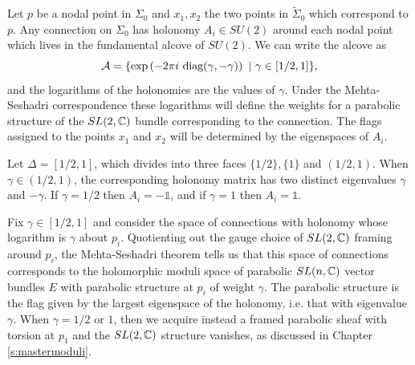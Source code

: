 	Let $p$ be a nodal point in $\Sigma_0$ and $x_1,x_2$ the two points in $\tilde{\Sigma}_0$ which correspond to $p$. Any connection on $\Sigma_0$ has holonomy $A_i\in SU(2)$ around each nodal point which lives in the fundamental alcove of $SU(2)$. We can write the alcove as
	\begin{equation}
		\mathcal{A} = \{\exp\left(
		-2\pi i ~\text{diag}(\gamma, -\gamma)
		\right)~|~ \gamma \in[1/2,1]\},
	\end{equation}
	and the logarithms of the holonomies are the values of $\gamma$. Under the Mehta-Seshadri correspondence these logarithms will define the weights for a parabolic structure of the $SL(2,\mathbb{C})$ bundle corresponding to the connection. The flags assigned to the points $x_1$ and $x_2$ will be determined by the eigenspaces of $A_i$.
	
	Let $\Delta = [1/2,1]$, which divides into three faces $\{1/2\}, \{1\}$ and $(1/2,1)$. When $\gamma \in (1/2,1)$, the corresponding holonomy matrix has two distinct eigenvalues $\gamma$ and $-\gamma$.  If $\gamma=1/2$ then $A_i = -\mathds{1}$, and if $\gamma = 1$ then $A_i = \mathds{1}$.
	
	Fix $\gamma \in [1/2,1]$ and consider the space of connections with holonomy whose logarithm is $\gamma$ about $p_i$. Quotienting out the gauge choice of $SL(2,\mathbb{C})$ framing around $p_i$, the Mehta-Seshadri theorem \cite{mehta_moduli_1980} tells us that this space of connections corresponds to the holomorphic moduli space of parabolic $SL(n,\mathbb{C})$ vector bundles $E$ with parabolic structure at $p_i$ of weight $\gamma$. The parabolic structure is the flag given by the largest eigenspace of the holonomy, i.e. that with eigenvalue $\gamma$. When $\gamma = 1/2$ or $1$, then we acquire instead a framed parabolic sheaf with torsion at $p_1$ and the $SL(2,\mathbb{C})$ structure vanishes, as discussed in Chapter \ref{s:mastermoduli}.
		
